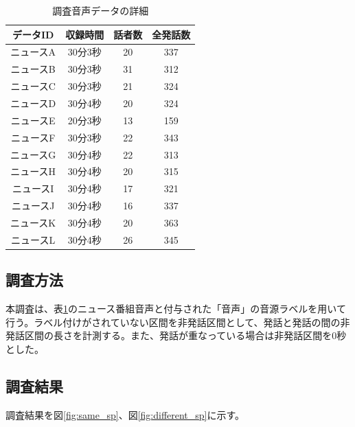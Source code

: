 \begin{table}[H]
  \begin{center}
    \caption{調査音声データの詳細　\label{table:train_detail}}
    \begin{tabular}{|c||c|c|c|} \hline
      データID & 収録時間 & 話者数 & 全発話数 \\ \hline
      ニュースA & 30分3秒 & 20 & 337 \\ \hline
      ニュースB & 30分3秒 & 31 & 312\\ \hline
      ニュースC & 30分3秒 & 21 & 324 \\ \hline
      ニュースD & 30分4秒 & 20 & 324\\ \hline
      ニュースE & 20分3秒 & 13 & 159\\ \hline
      ニュースF & 30分3秒 & 22 & 343\\ \hline
      ニュースG & 30分4秒 & 22 & 313\\ \hline
      ニュースH & 30分4秒 & 20 & 315\\ \hline
      ニュースI & 30分4秒 & 17 & 321\\ \hline
      ニュースJ & 30分4秒 & 16 & 337\\ \hline
      ニュースK & 30分4秒 & 20 & 363\\ \hline
      ニュースL & 30分4秒 & 26 & 345\\ \hline
    \end{tabular}
  \end{center}
\end{table}

\subsection{調査方法}
本調査は、表\ref{table:train_detail}のニュース番組音声と付与された「音声」の音源ラベルを用いて行う。ラベル付けがされていない区間を非発話区間として、発話と発話の間の非発話区間の長さを計測する。また、発話が重なっている場合は非発話区間を0秒とした。

\subsection{調査結果}
調査結果を図\ref{fig:same_sp}、図\ref{fig:different_sp}に示す。

